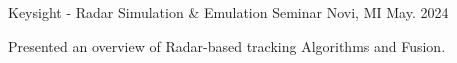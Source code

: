 

\begin{cventries}

  \cventry
    {} %
    {Keysight - Radar Simulation & Emulation Seminar} %
    {Novi, MI} %
    {May. 2024} %
    {
      \begin{cvitems} %
        \item {Presented an overview of Radar-based tracking Algorithms and Fusion.}
      \end{cvitems}
    }


\end{cventries}
